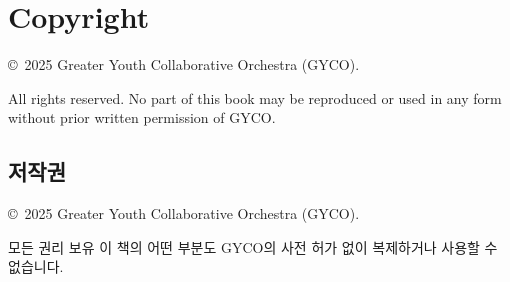 \newpage
\section*{Copyright}
\copyright\ 2025 Greater Youth Collaborative Orchestra (GYCO).

All rights reserved. No part of this book may be reproduced or used in any form 
without prior written permission of GYCO.

\subsection*{저작권}
\copyright\ 2025 Greater Youth Collaborative Orchestra (GYCO).

모든 권리 보유 이 책의 어떤 부분도 GYCO의 사전 허가 없이 복제하거나 사용할 수 없습니다.
